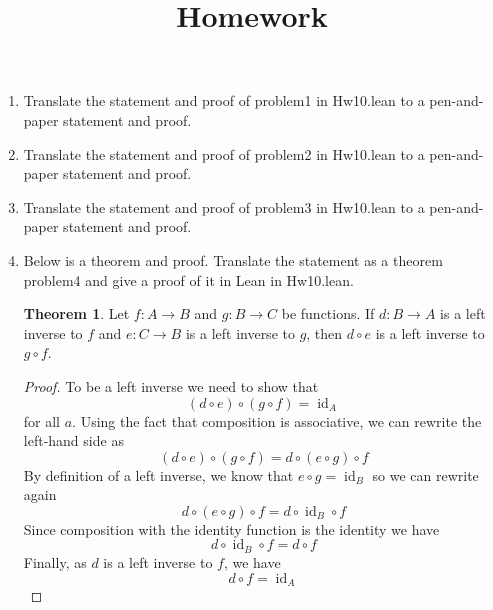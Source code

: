 \documentclass[12pt]{amsart}
\theoremstyle{definition}
\newtheorem*{theorem*}{Theorem}
\begin{document}
\title{Homework}

\maketitle

\begin{enumerate}
	\item Translate the statement and proof of problem1 in Hw10.lean to 
		a pen-and-paper statement and proof. 

	\item Translate the statement and proof of problem2 in Hw10.lean to 
		a pen-and-paper statement and proof. 

	\item Translate the statement and proof of problem3 in Hw10.lean to 
		a pen-and-paper statement and proof. 

	\item Below is a theorem and proof. Translate the statement as a 
		theorem problem4 and give a proof of it in Lean in Hw10.lean. 

	\begin{theorem*}
		Let $f : A \to B$ and $g : B \to C$ be 
		functions. If $d : B \to A$ is a left inverse to $f$ and  
		$e : C \to B$ is a left inverse to $g$, then $d \circ e$ is a left 
		inverse to $g \circ f$. 
	\end{theorem*}
		
	\begin{proof}
		To be a left inverse we need to show that 
		\begin{displaymath}
			(d \circ e) \circ (g \circ f) = \operatorname{id}_A 
		\end{displaymath}
		for all $a$. Using the fact that composition is associative, 
		we can rewrite the left-hand side as 
		\begin{displaymath}
			(d \circ e) \circ (g \circ f)  = d \circ (e \circ g) \circ f
		\end{displaymath}
		By definition of a left inverse, we know that $e \circ g = 
		\operatorname{id}_B$ so we can rewrite again 
		\begin{displaymath}
			d \circ (e \circ g) \circ f = d \circ \operatorname{id}_B 
			\circ f 
		\end{displaymath}
		Since composition with the identity function is the identity we 
		have 
		\begin{displaymath}
			d \circ \operatorname{id}_B \circ f = d \circ f 
		\end{displaymath}
		Finally, as $d$ is a left inverse to $f$, we have 
		\begin{displaymath}
			d \circ f = \operatorname{id}_A
		\end{displaymath}
	\end{proof}
		

\end{enumerate}
\end{document}
